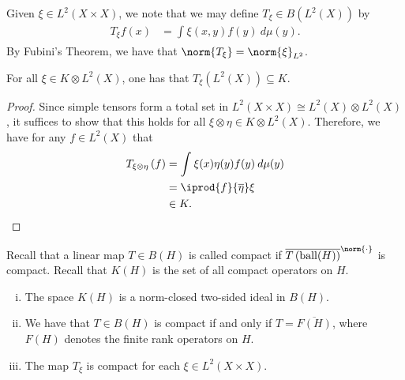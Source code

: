 \documentclass[10pt]{mypackage}
\begin{document}
Given $\xi\in L^2\left( X\times X \right)$, we note that we may define $T_{\xi}\in B\left( L^2\left( X \right) \right)$ by
\begin{align*}
  T_{\xi}f(x) &= \int_{}^{} \xi\left( x,y \right)f(y)\:d\mu(y).
\end{align*}
By Fubini's Theorem, we have that $\norm{T_{\xi}} = \norm{\xi}_{L^2}$.
\begin{proposition}
  For all $\xi\in K\otimes L^2\left( X \right)$, one has that $T_{\xi}\left( L^2(X) \right)\subseteq K$.
\end{proposition}
\begin{proof}
  Since simple tensors form a total set in $L^2\left( X\times X \right)\cong L^2\left( X \right)\otimes L^2\left( X \right)$, it suffices to show that this holds for all $\xi\otimes\eta\in K\otimes L^2\left( X \right)$. Therefore, we have for any $f\in L^2\left( X \right)$ that
  \begin{align*}
    T_{\xi\otimes\eta}\left( f \right) &= \int_{}^{} \xi(x)\eta(y)f(y)\:d\mu(y)\\
                                       &= \iprod{f}{ \overline{\eta} }\xi\\
                                       &\in K.
  \end{align*}
\end{proof}
Recall that a linear map $T\in B(H)$ is called compact if $ \overline{T\left( \operatorname{ball}(H) \right)}^{\norm{\cdot}} $ is compact. Recall that $K(H)$ is the set of all compact operators on $H$.
\begin{proposition}
  \begin{enumerate}[(i)]
    \item The space $K(H)$ is a norm-closed two-sided ideal in $B(H)$.
    \item We have that $T\in B(H)$ is compact if and only if $T = \overline{F(H)}$, where $F(H)$ denotes the finite rank operators on $H$.
    \item The map $T_{\xi}$ is compact for each $\xi\in L^2\left( X\times X \right)$.
  \end{enumerate}
\end{proposition}
\end{document}
